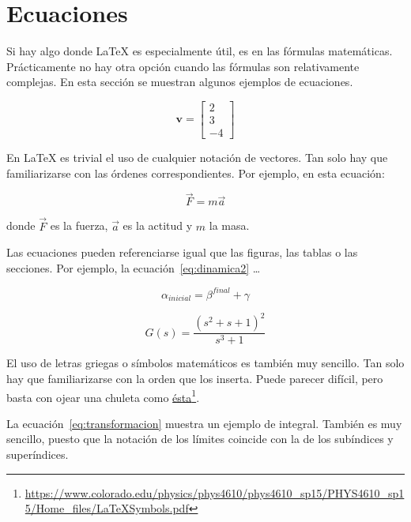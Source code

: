 \section{Ecuaciones} 
\label{sec:ecuaciones}

Si hay algo donde \LaTeX{} es especialmente útil, es en las fórmulas matemáticas.  Prácticamente no hay otra opción cuando las fórmulas son relativamente complejas.  En esta sección se muestran algunos ejemplos de ecuaciones.

\begin{equation}
    \mathbf{v} = \left[
    \begin{array}{c}
        2 \\
        3 \\
        -4 
    \end{array}
    \right]
\end{equation}

En \LaTeX{} es trivial el uso de cualquier notación de vectores.  Tan solo hay que familiarizarse con las órdenes correspondientes.  Por ejemplo, en esta ecuación:

\begin{equation} 
\vec{F} = m \vec{a}
\label{eq:dinamica}
\end{equation}

donde $\vec{F}$ es la fuerza, $\vec{a}$ es la actitud y $m$ la masa.

Las ecuaciones pueden referenciarse igual que las figuras, las tablas o las secciones.  Por ejemplo, la ecuación~\ref{eq:dinamica2} \ldots

\begin{equation} 
\alpha_{inicial} = \beta^{final} + \gamma
\label{eq:dinamica2}
\end{equation}

\begin{equation}
G(s)=\frac{(s^2+s+1)^2}{s^3+1}
\label{eq:dinamica3}
\end{equation}

El uso de letras griegas o símbolos matemáticos es también muy sencillo.  Tan solo hay que familiarizarse con la orden que los inserta.  Puede parecer difícil, pero basta con ojear una chuleta como \href{https://www.colorado.edu/physics/phys4610/phys4610_sp15/PHYS4610_sp15/Home_files/LaTeXSymbols.pdf}{ésta}\footnote{\url{https://www.colorado.edu/physics/phys4610/phys4610_sp15/PHYS4610_sp15/Home_files/LaTeXSymbols.pdf}}.

La ecuación~\ref{eq:transformacion} muestra un ejemplo de integral.  También es muy sencillo, puesto que la notación de los límites coincide con la de los subíndices y superíndices.

